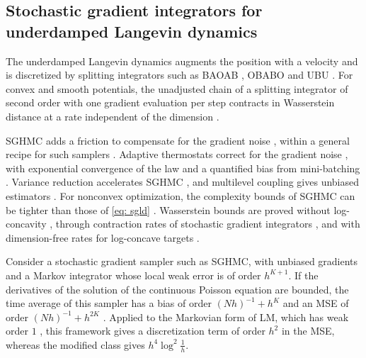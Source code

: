 \documentclass{article}
\numberwithin{equation}{section}
\begin{document}
\subsection{Stochastic gradient integrators for underdamped Langevin dynamics}
\label{subsec: related underdamped}

The underdamped Langevin dynamics augments the position with a velocity and is discretized by splitting integrators such as BAOAB \citep{leimkuhler2013rational, leimkuhler2015molecular}, OBABO \citep{bussi2007accurate} and UBU \citep{sanz2021wasserstein, paulin2024correction}. For convex and smooth potentials, the unadjusted chain of a splitting integrator of second order with one gradient evaluation per step contracts in Wasserstein distance at a rate independent of the dimension \citep{monmarche2021high}.

SGHMC adds a friction to compensate for the gradient noise \citep{chen2014stochastic}, within a general recipe for such samplers \citep{ma2015complete}. Adaptive thermostats correct for the gradient noise \citep{ding2014bayesian, leimkuhler2016adaptive, shang2015covariance}, with exponential convergence of the law \citep{leimkuhler2020hypocoercivity} and a quantified bias from mini-batching \citep{sekkat2023minibatching}. Variance reduction accelerates SGHMC \citep{li2019variance, zou2018stochastic, zou2019stochastic, chatterji2018theory, zou2021convergence}, and multilevel coupling gives unbiased estimators \citep{chada2026unbiased}. For nonconvex optimization, the complexity bounds of SGHMC can be tighter than those of \eqref{eq: sgld} \citep{gao2022global}. Wasserstein bounds are proved without log-concavity \citep{akyildiz2024nonasymptotic, chak2023reflection}, through contraction rates of stochastic gradient integrators \citep{leimkuhler2023contraction}, and with dimension-free rates for log-concave targets \citep{gouraud2025hmc}.

Consider a stochastic gradient sampler such as SGHMC, with unbiased gradients and a Markov integrator whose local weak error is of order $h^{K+1}$. If the derivatives of the solution of the continuous Poisson equation are bounded, the time average of this sampler has a bias of order $(Nh)^{-1} + h^K$ and an MSE of order $(Nh)^{-1} + h^{2K}$ \citep[Theorems~2 and~3]{chen2015convergence}. Applied to the Markovian form of LM, which has weak order $1$ \citep{ye2026mse}, this framework gives a discretization term of order $h^2$ in the MSE, whereas the modified class gives $h^4 \log^2\frac1h$.
\end{document}

